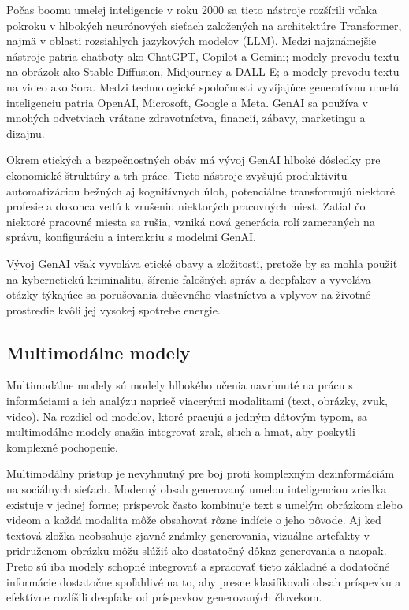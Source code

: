 \documentclass[]{tukediphc}
\begin{document}
Počas boomu umelej inteligencie v roku 2000 sa tieto nástroje rozšírili vďaka pokroku v hlbokých neurónových sieťach založených na architektúre Transformer, najmä v oblasti rozsiahlych jazykových modelov (LLM). Medzi najznámejšie nástroje patria chatboty ako ChatGPT, Copilot a Gemini; modely prevodu textu na obrázok ako Stable Diffusion, Midjourney a DALL-E; a modely prevodu textu na video ako Sora. Medzi technologické spoločnosti vyvíjajúce generatívnu umelú inteligenciu patria OpenAI, Microsoft, Google a Meta. GenAI sa používa v mnohých odvetviach vrátane zdravotníctva, financií, zábavy, marketingu a dizajnu.\cite{wiki:genai}

Okrem etických a bezpečnostných obáv má vývoj GenAI hlboké dôsledky pre ekonomické štruktúry a trh práce. Tieto nástroje zvyšujú produktivitu automatizáciou bežných aj kognitívnych úloh, potenciálne transformujú niektoré profesie a dokonca vedú k zrušeniu niektorých pracovných miest. Zatiaľ čo niektoré pracovné miesta sa rušia, vzniká nová generácia rolí zameraných na správu, konfiguráciu a interakciu s modelmi GenAI.

Vývoj GenAI však vyvoláva etické obavy a zložitosti, pretože by sa mohla použiť na kybernetickú kriminalitu, šírenie falošných správ a deepfakov a vyvoláva otázky týkajúce sa porušovania duševného vlastníctva a vplyvov na životné prostredie kvôli jej vysokej spotrebe energie.

\subsection{Multimodálne modely}
Multimodálne modely sú modely hlbokého učenia navrhnuté na prácu s informáciami a ich analýzu naprieč viacerými modalitami (text, obrázky, zvuk, video). Na rozdiel od modelov, ktoré pracujú s jedným dátovým typom, sa multimodálne modely snažia integrovať zrak, sluch a hmat, aby poskytli komplexné pochopenie.

Multimodálny prístup je nevyhnutný pre boj proti komplexným dezinformáciám na sociálnych sieťach. Moderný obsah generovaný umelou inteligenciou zriedka existuje v jednej forme; príspevok často kombinuje text s umelým obrázkom alebo videom a každá modalita môže obsahovať rôzne indície o jeho pôvode. Aj keď textová zložka neobsahuje zjavné známky generovania, vizuálne artefakty v pridruženom obrázku môžu slúžiť ako dostatočný dôkaz generovania a naopak. Preto sú iba modely schopné integrovať a spracovať tieto základné a dodatočné informácie dostatočne spoľahlivé na to, aby presne klasifikovali obsah príspevku a efektívne rozlíšili deepfake od príspevkov generovaných človekom.
\end{document}
